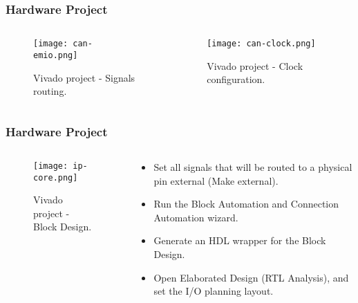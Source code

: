 \begin{frame}
	\frametitle{Hardware Project}
	\begin{columns}
		\begin{column}{0.5\textwidth}
			\begin{figure}
				\texttt{[image: can-emio.png]}
				\caption{Vivado project - Signals routing.}\label{fig:can-emio}
			\end{figure}
		\end{column} \pause
		\begin{column}{0.5\textwidth}
			\begin{figure}
				\texttt{[image: can-clock.png]}
				\caption{Vivado project - Clock configuration.}\label{fig:can-clock}
			\end{figure}
		\end{column}
	\end{columns}
\end{frame}

\begin{frame}
	\frametitle{Hardware Project}
	\begin{columns}
		\begin{column}{0.5\textwidth}
			\begin{figure}
				\texttt{[image: ip-core.png]}
				\caption{Vivado project - Block Design.}\label{fig:ip-core}
			\end{figure}
		\end{column}
		\begin{column}{0.5\textwidth}
			\begin{itemize}
				\item Set all signals that will be routed to a physical pin external (Make external).
				\item Run the Block Automation and Connection Automation wizard.
				\item Generate an HDL wrapper for the Block Design.
				\item Open Elaborated Design (RTL Analysis), and set the I/O planning layout.
			\end{itemize}
		\end{column}
	\end{columns}
\end{frame}

